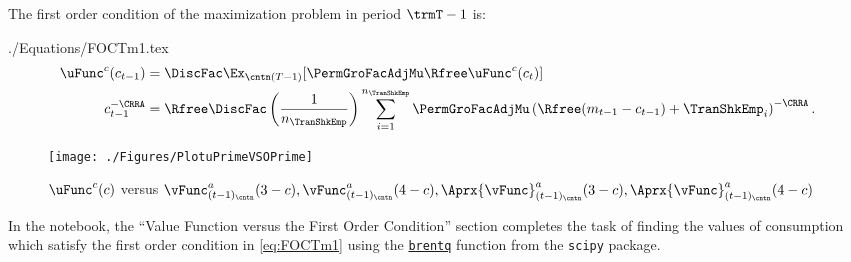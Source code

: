 \documentclass[\econtexRoot/SolvingMicroDSOPs]{subfiles}
\begin{document}
The first order condition of the maximization problem in period $\trmT-1$ is:
\begin{verbatimwrite}{./Equations/FOCTm1.tex}
  \begin{equation}\begin{gathered}\begin{aligned}
        \uFunc^{{c}}({c}_{\prdT-1})       & = \DiscFac \Ex_{\cntn(T-1)} [\PermGroFacAdjMu\Rfree \uFunc^{{c}}({c}_{\prdT})]  %
        \\      {c}_{\prdT-1}^{-\CRRA}   & = \Rfree \DiscFac \left(\frac{1}{n_{\TranShkEmp}}\right) \sum_{i=1}^{n_{\TranShkEmp}} \PermGroFacAdjMu\left(\Rfree ({m}_{\prdT-1}-{c}_{\prdT-1}) + \TranShkEmp_{i}\right)^{-\CRRA} \label{eq:FOCTm1}.
      \end{aligned}\end{gathered}\end{equation}
\end{verbatimwrite}
\unskip
{}
\hypertarget{PlotuPrimeVSOPrime}{}
\begin{figure}
  \centerline{\texttt{[image: ./Figures/PlotuPrimeVSOPrime]}}
  \caption{$\uFunc^{{c}}(c)$ versus $\vFunc_{({\prdT-1})_\cntn}^{{a}}(3-c), \vFunc_{({\prdT-1})_\cntn}^{{a}}(4-c), \Aprx{\vFunc}_{({\prdT-1})_\cntn}^{{a}}(3-c), \Aprx{\vFunc}_{({\prdT-1})_\cntn}^{{a}}(4-c)$}
  \label{fig:PlotuPrimeVSOPrime}
\end{figure}

In the notebook, the ``Value Function versus the First Order Condition'' section completes the task of finding the values of consumption which satisfy the first order condition in \eqref{eq:FOCTm1} using the \href{https://docs.scipy.org/doc/scipy/reference/generated/scipy.optimize.brentq.html}{\texttt{brentq}} function from the \texttt{scipy} package. %
\end{document}
